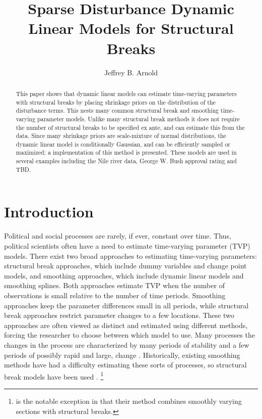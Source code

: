 \documentclass{article}
\author{Jeffrey B. Arnold}
\title{Sparse Disturbance Dynamic Linear Models for Structural Breaks}
\begin{document}
\maketitle{}

\begin{abstract}
  This paper shows that dynamic linear models can estimate time-varying parameters with structural breaks by placing shrinkage priors on the distribution of the disturbance terms. 
  This nests many common structural break and smoothing time-varying parameter models.
  Unlike many structural break methods it does not require the number of structural breaks to be specified ex ante, and can estimate this from the data.
  Since many shrinkage priors are scale-mixture of normal distributions, the dynamic linear model is conditionally Gaussian, and can be efficiently sampled or maximized; 
  a \Stan{} implementation of this method is presented.
  These models are used in several examples including the Nile river data, George W. Bush approval rating and TBD.
\end{abstract}

\section{Introduction}
\label{sec:introduction}

Political and social processes are rarely, if ever, constant over time.
Thus, political scientists often have a need to estimate time-varying parameter (TVP) models.
There exist two broad approaches to estimating time-varying parameters: structural break approaches, which include dummy variables and change point models, and smoothing approaches, which include dynamic linear models and smoothing splines.
Both approaches estimate TVP when the number of observations is small relative to the number of time periods. 
Smoothing approaches keep the parameter differences small in all periods, while structural break approaches restrict parameter changes to a few locations.
These two approaches are often viewed as distinct and estimated using different methods, forcing the researcher to choose between which model to use.
Many processes the changes in the process are characterized by many periods of stability and a few periods of possibly rapid and large, change \parencite{RatkovicEng2010}.
Historically, existing smoothing methods have had a difficulty estimating these sorts of processes, so structural break models have been used \parencites{CalderiaZorn1998}{Spirling2007a}{Spirling2007b}{Park2010}{Park2011}.%
\footnote{\textcite{RatkovicEng2010} is the notable exception in that their method combines smoothly varying sections with structural breaks.}
\end{document}
